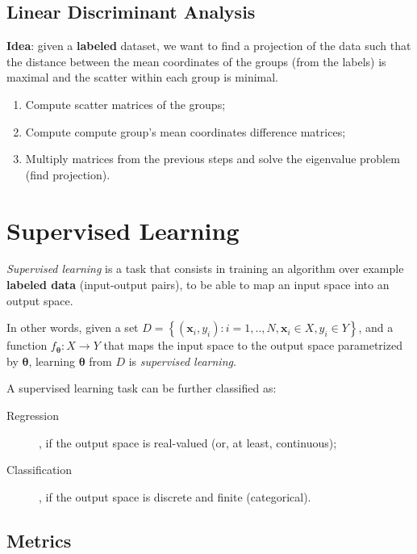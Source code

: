 \documentclass[a4paper]{report}
\begin{document}
\subsection*{Linear Discriminant Analysis}

\textbf{Idea}: given a \textbf{labeled} dataset, we want to find a projection of the data such that the distance between the mean coordinates of the groups (from the labels) is maximal and the scatter within each group is minimal.

\begin{enumerate}
    \item Compute scatter matrices of the groups;
    \item Compute compute group's mean coordinates difference matrices;
    \item Multiply matrices from the previous steps and solve the eigenvalue problem (find projection).
\end{enumerate}

\section*{Supervised Learning}

\begin{definition}
    \emph{Supervised learning} is a task that consists in training an algorithm over example \textbf{labeled data} (input-output pairs), to be able to map an input space into an output space.

    In other words, given a set $D=\left\{ (\bm{x}_i,y_i) : i= {1,..,N} , \bm{x}_i \in  X, y_i \in Y \right\} $, and a function $f_{\bm{\theta}} : X \to  Y$ that maps the input space to the output space parametrized by $\bm{\theta}$, learning $\bm{\theta}$ from $D$ is \emph{supervised learning}.
\end{definition}

\begin{note}
    A supervised learning task can be further classified as:
    \begin{description}
	\item[Regression], if the output space is real-valued (or, at least, continuous);
	\item[Classification], if the output space is discrete and finite (categorical).
    \end{description}
\end{note}

\subsection*{Metrics}
\end{document}
